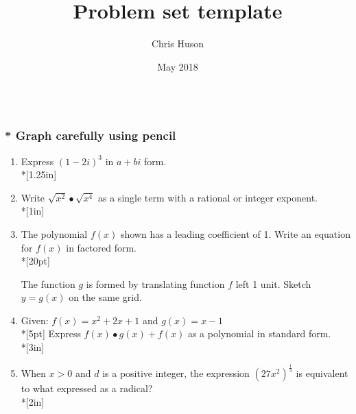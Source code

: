 \documentclass[12pt, oneside]{article}
\title{Problem set template}
\author{Chris Huson}
\date{May 2018}
\begin{document}

\subsubsection*{\\* \textnormal{Graph carefully using pencil}}

\begin{enumerate}


\item Express $(1-2i)^3$ in $a+bi$ form. \\*[1.25in] %

\item Write $\sqrt{x^2} \bullet \sqrt{x^4}$ as a single term with a rational or integer exponent.\\*[1in]

\item The polynomial $f(x)$ shown has a leading coefficient of 1. Write an equation for $f(x)$ in factored form.\\*[20pt]
\begin{center}
\end{center}
The function $g$ is formed by translating function $f$ left 1 unit. Sketch $y=g(x)$ on the same grid.

\newpage

\item Given: $f(x)=x^2 + 2x + 1$ and $g(x)=x-1$\\*[5pt]
Express $f(x) \bullet g(x) + f(x)$ as a polynomial in standard form. \\*[3in]


\item When $x>0$ and $d$ is a positive integer, the expression $\displaystyle \left(27x^2 \right)^\frac{1}{3}$ is equivalent to what expressed as a radical? \\*[2in]


\end{enumerate}
\end{document}
